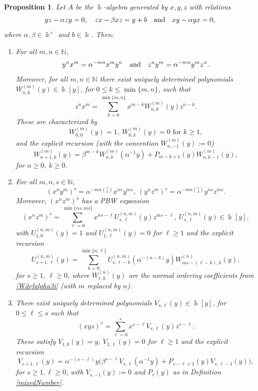 \documentclass{amsart}
\newtheorem{proposition}[theorem]{Proposition}
\theoremstyle{definition}
\theoremstyle{remark}
\numberwithin{equation}{section}
\begin{document}
\begin{proposition}\label{Case(3)(i)}
Let $A$ be the $\Bbbk$-algebra generated by $x,y,z$ with relations
\[
yz - \alpha zy = 0, \quad zx - \beta xz = y + b \quad {\rm and} \quad xy - \alpha yx = 0,
\]
where $\alpha,\beta\in\Bbbk^{\times}$ and $b\in\Bbbk$. Then:
\begin{enumerate}
\item [\rm (1)] For all $m,n\in\mathbb{N}$,
\[
y^n x^m=\alpha^{-mn}x^m y^n \quad {\rm and} \quad z^n y^m=\alpha^{-mn}y^m z^n.
\]
Moreover, for all $m, n\in\mathbb{N}$ there exist uniquely determined polynomials $W^{(m)}_{n,k}(y)\in\Bbbk[y]$, for $0\le k\le \min\{m,n\}$, such that
\begin{equation}\label{Wdefalpha3i}
z^n x^m=\sum_{k=0}^{\min\{m,n\}} x^{m-k}W^{(m)}_{n,k}(y)z^{n-k}.
\end{equation}
These are characterized by
\[
W^{(m)}_{0,0}(y)=1,\ W^{(m)}_{0,k}(y)=0 \text{ for } k\ge 1,
\]
and the explicit recursion {\rm (}with the convention $W^{(m)}_{n,-1}(y):=0${\rm )}
\begin{equation}\label{Wrecalpha3i}
W^{(m)}_{n+1,k}(y)=\beta^{m-k}W^{(m)}_{n,k}(\alpha^{-1}y)+P_{m-k+1}(y)W^{(m)}_{n,k-1}(y), 
\end{equation}
for $n\ge 0,\ k\ge 0$.

\item [\rm (2)] For all $m,n,s\in\mathbb{N}$,
\[
(x^n y^m)^s=\alpha^{-mn\binom{s}{2}}x^{ns}y^{ms}, \ (y^n z^m)^s=\alpha^{-mn\binom{s}{2}}y^{ns}z^{ms}.
\]
Moreover, $(x^n z^m)^s$ has a PBW expansion
\begin{equation}\label{Udefalpha3i}
(x^n z^m)^s=\sum_{\ell=0}^{\min\{ns,ms\}} x^{ns-\ell}U^{(n,m)}_{s,\ell}(y)z^{ms-\ell},
\ U^{(n,m)}_{s,\ell}(y)\in\Bbbk[y],
\end{equation}
with $U^{(n,m)}_{1,0}(y)=1$ and $U^{(n,m)}_{1,\ell}(y)=0$ for $\ell\ge 1$ and the explicit recursion
\begin{equation}\label{Urecalpha3i}
U^{(n,m)}_{s+1,\ell}(y)=\sum_{k=0}^{\min\{n,\ell\}}
U^{(n,m)}_{s,\ell-k}(\alpha^{-(n-k)}y)W^{(n)}_{ms-(\ell-k),k}(y), 
\end{equation}
for $s\ge 1,\ \ell\ge 0$, where $W^{(n)}_{r,k}(y)$ are the normal ordering coefficients from \eqref{Wdefalpha3i} {\rm (}with $m$ replaced by $n${\rm )}.

\item [\rm (3)] There exist uniquely determined polynomials $V_{s,\ell}(y)\in\Bbbk[y]$, for $0\le \ell\le s$ such that
\begin{equation}\label{Vdefalpha3i}
(xyz)^s=\sum_{\ell=0}^{s} x^{s-\ell}V_{s,\ell}(y)z^{s-\ell}.
\end{equation}
These satisfy $V_{1,0}(y)=y$, $V_{1,\ell}(y)=0$ for $\ell\ge 1$ and the explicit recursion
\begin{equation}\label{Vrecalpha3i}
V_{s+1,\ell}(y)=\alpha^{-(s-\ell)}y\Big(\beta^{s-\ell}V_{s,\ell}(\alpha^{-1}y)+P_{s-\ell+1}(y)V_{s,\ell-1}(y)\Big),
\end{equation}
for $s\ge 1, \ell\ge 0$, with $V_{s,-1}(y):=0$ and $P_r(y)$ as in Definition \ref{mixedNumber}.


\end{enumerate}
\end{proposition}
\end{document}

